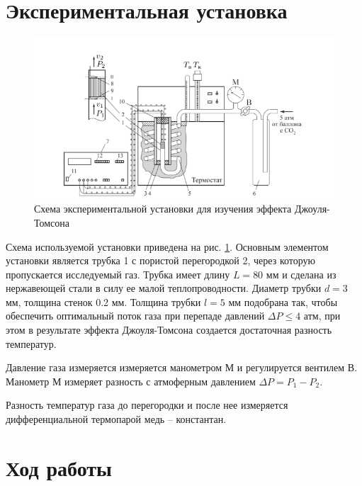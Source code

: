 \documentclass[12pt]{article}
\begin{document}
    \section{Экспериментальная установка}
    \begin{figure}[h]
        \centering
        \includegraphics[scale=3]{stand.png}
        \caption{Схема экспериментальной установки для изучения эффекта Джоуля-Томсона}
        \label{stand}
    \end{figure}
    Схема используемой установки приведена на рис. \ref{stand}. Основным
    элементом установки является трубка 1 с пористой перегородкой 2, через
    которую пропускается исследуемый газ. Трубка имеет длину $L = 80$ мм и
    сделана из нержавеющей стали в силу ее малой теплопроводности. Диаметр
    трубки $d = 3$ мм, толщина стенок 0.2 мм. Толщина трубки $l = 5$ мм 
    подобрана так, чтобы обеспечить оптимальный поток газа при перепаде
    давлений $\Delta P \le 4$ атм, при этом в результате эффекта Джоуля-Томсона
    создается достаточная разность температур. 
    \par Давление газа измеряется измеряется манометром М и регулируется 
    вентилем В. Манометр М измеряет разность с атмоферным давлением 
    $\Delta P = P_1 - P_2$.
    \par Разность температур газа до перегородки и после нее измеряется 
    дифференциальной термопарой медь -- константан.

    \section{Ход работы}
\end{document}
